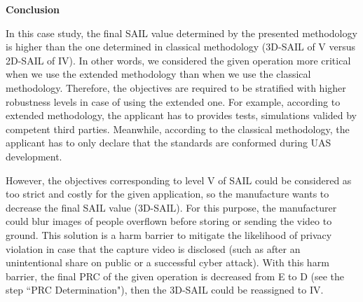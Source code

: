 \documentclass[a4paper, 10, conference]{ieeeconf}  %
\begin{document}
\textbf{Conclusion}

In this case study, the final SAIL value determined by the presented methodology is higher than the one determined in classical methodology (3D-SAIL of V versus 2D-SAIL of IV). In other words, we considered the given operation more critical when we use the extended methodology than when we use the classical methodology. Therefore, the objectives are required to be stratified with higher robustness levels in case of using the extended one. For example, according to extended methodology, the applicant has to provides tests, simulations valided by competent third parties. Meanwhile, according to the classical methodology, the applicant has to only declare that the standards are conformed during UAS development.

However, the objectives corresponding to level V of SAIL could be considered as too strict and costly for the given application, so the manufacture wants to decrease the final SAIL value (3D-SAIL). For this purpose, the manufacturer could blur images of people overflown before storing or sending the video to ground. This solution is a harm barrier to mitigate the likelihood of privacy violation in case that the capture video is disclosed (such as after an unintentional share on public or a successful cyber attack). With this harm barrier, the final PRC of the given operation is decreased from E to D (see the step ``PRC Determination"), then the 3D-SAIL could be reassigned to IV.


 
\end{document}

